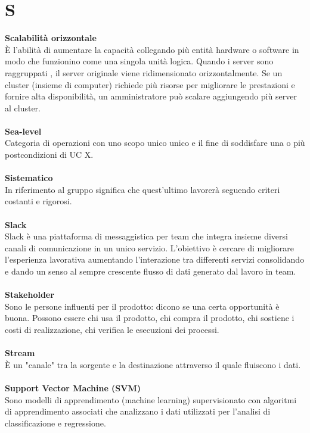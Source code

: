 \section{S}
\textbf{Scalabilità orizzontale}\\
È l'abilità di aumentare la capacità collegando più entità hardware o software in modo che funzionino come una singola unità logica. Quando i server sono raggruppati , il server originale viene ridimensionato orizzontalmente. Se un cluster (insieme di computer) richiede più risorse per migliorare le prestazioni e fornire alta disponibilità, un amministratore può scalare aggiungendo più server al cluster. \\ \\
\textbf{Sea-level}\\
Categoria di operazioni con uno scopo unico unico e il fine di soddisfare una o più postcondizioni di UC X. \\ \\
\textbf{Sistematico}\\
In riferimento al gruppo \Gruppo{} significa che quest'ultimo lavorerà seguendo criteri costanti e rigorosi. \\ \\
\textbf{Slack}\\
Slack è una piattaforma di messaggistica per team che integra insieme diversi canali di comunicazione in un unico servizio. L’obiettivo è cercare di migliorare l’esperienza lavorativa aumentando l’interazione tra differenti servizi consolidando e dando un senso al sempre crescente flusso di dati generato dal lavoro in team. \\ \\
\textbf{Stakeholder}\\
Sono le persone influenti per il prodotto: dicono se una certa opportunità è buona. Possono essere chi usa il prodotto, chi compra il prodotto, chi sostiene i costi di realizzazione, chi verifica le esecuzioni dei processi. \\ \\
\textbf{Stream}\\
È un "canale" tra la sorgente e la destinazione attraverso il quale fluiscono i dati. \\ \\
\textbf{Support Vector Machine (SVM)}\\
Sono modelli di apprendimento (machine learning) supervisionato con algoritmi di apprendimento associati che analizzano i dati utilizzati per l'analisi di classificazione e regressione. \\ \\
\clearpage